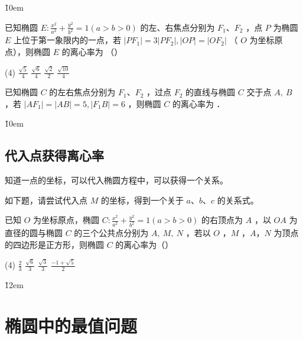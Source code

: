 \v{10em}

\begin{example}
    已知椭圆 $E: \frac{x^2}{a^2}+\frac{y^2}{b^2}=1(a>b>0)$ 的左、右焦点分别为 $F_1$、$ F_2$ ，点 $P$ 为椭圆 $E$ 上位于第一象限内的一点，若 $\left|P F_1\right|=3\left|P F_2\right|,|O P|=\left|O F_2\right|$ （ $O$ 为坐标原点），则椭圆 $E$ 的离心率为 （\qquad）
    \begin{tasks}(4)
        \task $\frac{\sqrt{5}}{4}$
        \task $\frac{\sqrt{6}}{4}$
        \task $\frac{\sqrt{2}}{2}$
        \task $\frac{\sqrt{10}}{4}$
    \end{tasks}
\end{example}

\vspace{10em}

\begin{example}
    已知椭圆 $C$ 的左右焦点分别为 $F_1 、 F_2$ ，过点 $F_2$ 的直线与椭圆 $C$ 交于点 $A, ~ B$ ，若 $\left|A F_1\right|=|A B|=5,\left|F_1 B\right|=6$ ，则椭圆 $C$ 的离心率为 \underline{\qquad} ．
\end{example}

\v{10em}

\subsection{代入点获得离心率}

\begin{theorem}
    知道一点的坐标，可以代入椭圆方程中，可以获得一个关系。

    如下题，请尝试代入点 $M$ 的坐标，得到一个关于 $a$、$b$、$c$ 的关系式。
\end{theorem}

\begin{problem}
已知 $O$ 为坐标原点，椭圆 $C: \frac{x^2}{a^2}+\frac{y^2}{b^2}=1(a>b>0)$ 的右顶点为 $A$ ，以 $O A$ 为直径的圆与椭圆 $C$ 的三个公共点分别为 $A, ~ M, ~ N$ ，若以 $O$ ，$M$ ，$A$，$N$ 为顶点的四边形是正方形，则椭圆 $C$ 的离心率为（\hspace{2em}）
\begin{tasks}(4)
    \task $\frac{2}{3}$
    \task $\frac{\sqrt{6}}{3}$
    \task $\frac{\sqrt{3}}{3}$
    \task $\frac{-1+\sqrt{5}}{2}$
\end{tasks}
\end{problem}

\v{12em}

\section{椭圆中的最值问题}

